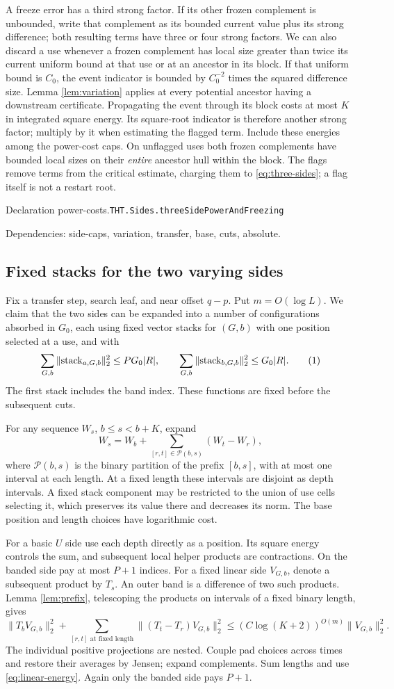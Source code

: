 \documentclass[11pt]{article}
\theoremstyle{definition}
\newcommand{\eqtag}[1]{\refstepcounter{equation}\tag{\theequation}\label{#1}}
\numberwithin{equation}{section}
\newcommand{\bp}[3]{\par\smallskip\begingroup\footnotesize
\noindent\hypertarget{bp:#1}{\textsf{Declaration #1.}}\quad\nolinkurl{#2}\par
\noindent\textsf{Dependencies:} #3.\par\endgroup\smallskip}
\begin{document}
A freeze error has a third strong factor. If its other frozen complement is unbounded, write that complement as its bounded current value plus its strong difference; both resulting terms have three or four strong factors. We can also discard a use whenever a frozen complement has local size greater than twice its current uniform bound at that use or at an ancestor in its block. If that uniform bound is $C_0$, the event indicator is bounded by $C_0^{-2}$ times the squared difference size. Lemma \ref{lem:variation} applies at every potential ancestor having a downstream certificate. Propagating the event through its block costs at most $K$ in integrated square energy. Its square-root indicator is therefore another strong factor; multiply by it when estimating the flagged term. Include these energies among the power-cost caps. On unflagged uses both frozen complements have bounded local sizes on their \emph{entire} ancestor hull within the block. The flags remove terms from the critical estimate, charging them to \eqref{eq:three-sides}; a flag itself is not a restart root.

\bp{power-costs}{THT.Sides.threeSidePowerAndFreezing}{side-caps, variation, transfer, base, cuts, absolute}

\subsection*{Fixed stacks for the two varying sides}
Fix a transfer step, search leaf, and near offset $q-p$. Put $m=O(\log L)$. We claim that the two sides can be expanded into a number of configurations absorbed in $G_0$, each using fixed vector stacks for $(G,b)$ with one position selected at a use, and with
\[
 \sum_{G,b}\|\mathrm{stack}_{a,G,b}\|_2^2\le PG_0|R|,
 \qquad \sum_{G,b}\|\mathrm{stack}_{b,G,b}\|_2^2\le G_0|R|.
 \eqtag{eq:stack-energy}
\]
The first stack includes the band index. These functions are fixed before the subsequent cuts.

For any sequence $W_s$, $b\le s<b+K$, expand
\[
 W_s=W_b+\sum_{[r,t]\in\mathcal P(b,s)}(W_t-W_r),
\]
where $\mathcal P(b,s)$ is the binary partition of the prefix $[b,s]$, with at most one interval at each length. At a fixed length these intervals are disjoint as depth intervals. A fixed stack component may be restricted to the union of use cells selecting it, which preserves its value there and decreases its norm. The base position and length choices have logarithmic cost.

For a basic $U$ side use each depth directly as a position. Its square energy controls the sum, and subsequent local helper products are contractions. On the banded side pay at most $P+1$ indices. For a fixed linear side $V_{G,b}$, denote a subsequent product by $T_s$. An outer band is a difference of two such products. Lemma \ref{lem:prefix}, telescoping the products on intervals of a fixed binary length, gives
\[
 \|T_bV_{G,b}\|_2^2+\sum_{[r,t]\text{ at fixed length}}
 \|(T_t-T_r)V_{G,b}\|_2^2
 \le(C\log(K+2))^{O(m)}\|V_{G,b}\|_2^2.
\]
The individual positive projections are nested. Couple pad choices across times and restore their averages by Jensen; expand complements. Sum lengths and use \eqref{eq:linear-energy}. Again only the banded side pays $P+1$.
\end{document}

